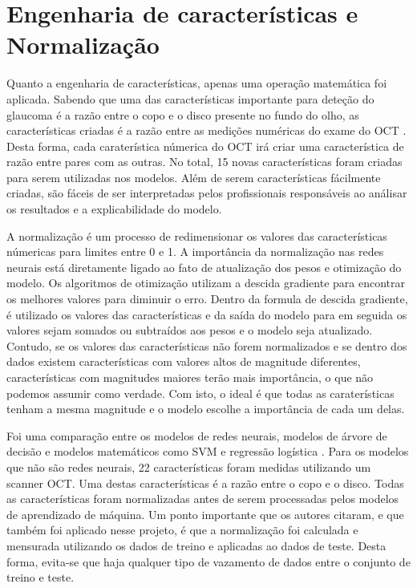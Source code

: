 \documentclass[ %
	msc, %
	portugues %
]{../ppgccufmg}
\begin{document}
    \section{Engenharia de características e Normalização}\label{sec:engineering}

    Quanto a engenharia de características, apenas uma operação matemática foi aplicada. Sabendo que
    uma das características importante para deteção do glaucoma é a razão entre o copo e o disco
    presente no fundo do olho, as características criadas é a razão entre as medições numéricas do
    exame do OCT \citep{pmid31403451}. Desta forma, cada caraterística númerica do OCT irá criar uma característica de
    razão entre pares com as outras. No total, 15 novas características foram criadas para serem
    utilizadas nos modelos. Além de serem características fácilmente criadas, são fáceis de ser
    interpretadas pelos profissionais responsáveis ao análisar os resultados e a explicabilidade do
    modelo.

    A normalização é um processo de redimensionar os valores das características númericas para
    limites entre 0 e 1. A importância da normalização nas redes neurais está diretamente ligado ao
    fato de atualização dos pesos e otimização do modelo.
    Os algoritmos de otimização utilizam a descida gradiente para
    encontrar os melhores valores para diminuir o erro. Dentro da formula de descida gradiente, é
    utilizado os valores das características e da saída do modelo para em seguida os valores sejam
    somados ou subtraídos aos pesos e o modelo seja atualizado. Contudo, se os valores das
    características não forem normalizados e se dentro dos dados existem características com valores
    altos de magnitude diferentes, características com magnitudes maiores terão mais importância, o
    que não podemos assumir como verdade. Com isto, o ideal é que todas as caraterísticas tenham a
    mesma magnitude e o modelo escolhe a importância de cada um delas.

    Foi uma comparação entre  os modelos de redes neurais,
    modelos de árvore de decisão e modelos matemáticos como SVM e regressão logística \citep{Maetschke2019-dy}.
    Para os modelos que não são redes neurais, 22 características foram medidas utilizando
    um scanner OCT. Uma destas características é a razão entre o copo e o disco. Todas as
    características foram normalizadas antes de serem processadas pelos modelos de aprendizado de
    máquina. Um ponto importante que os autores citaram, e que também foi aplicado nesse projeto, é
    que a normalização foi calculada e mensurada utilizando os dados de treino e aplicadas ao
    dados de teste. Desta forma, evita-se que haja qualquer tipo de vazamento de dados entre o
    conjunto de treino e teste.
\end{document}
